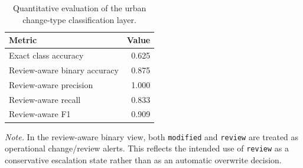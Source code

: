 \begin{table}[htbp]
\centering
\caption{Quantitative evaluation of the urban change-type classification layer.}
\label{tab:change_type_metrics}
\small
\begin{tabular}{lr}
\toprule
Metric & Value \\
\midrule
Exact class accuracy & 0.625 \\
Review-aware binary accuracy & 0.875 \\
Review-aware precision & 1.000 \\
Review-aware recall & 0.833 \\
Review-aware F1 & 0.909 \\
\bottomrule
\end{tabular}

\vspace{0.35em}
\parbox{0.88\textwidth}{\footnotesize \textit{Note.} In the review-aware binary view, both \texttt{modified} and \texttt{review} are treated as operational change/review alerts. This reflects the intended use of \texttt{review} as a conservative escalation state rather than as an automatic overwrite decision.}
\end{table}
